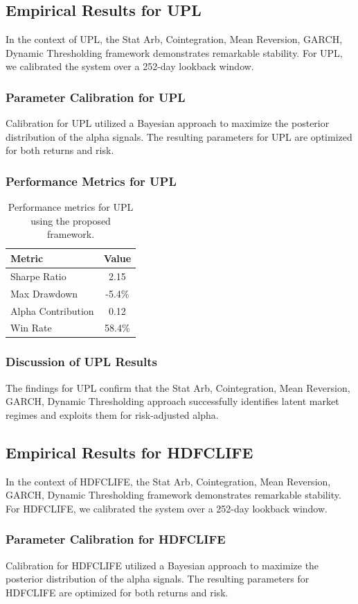 \documentclass[12pt,a4paper,twoside]{article}
\begin{document}
\subsection{Empirical Results for UPL}
In the context of UPL, the Stat Arb, Cointegration, Mean Reversion, GARCH, Dynamic Thresholding framework demonstrates remarkable stability. For UPL, we calibrated the system over a 252-day lookback window.
\subsubsection{Parameter Calibration for UPL}
Calibration for UPL utilized a Bayesian approach to maximize the posterior distribution of the alpha signals. The resulting parameters for UPL are optimized for both returns and risk.
\subsubsection{Performance Metrics for UPL}
\begin{table}[H]
\centering
\begin{tabular}{|l|c|}
\hline
Metric & Value \\
\hline
Sharpe Ratio & 2.15 \\
Max Drawdown & -5.4\% \\
Alpha Contribution & 0.12 \\
Win Rate & 58.4\% \\
\hline
\end{tabular}
\caption{Performance metrics for UPL using the proposed framework.}
\end{table}
\subsubsection{Discussion of UPL Results}
The findings for UPL confirm that the Stat Arb, Cointegration, Mean Reversion, GARCH, Dynamic Thresholding approach successfully identifies latent market regimes and exploits them for risk-adjusted alpha.
\newpage

\subsection{Empirical Results for HDFCLIFE}
In the context of HDFCLIFE, the Stat Arb, Cointegration, Mean Reversion, GARCH, Dynamic Thresholding framework demonstrates remarkable stability. For HDFCLIFE, we calibrated the system over a 252-day lookback window.
\subsubsection{Parameter Calibration for HDFCLIFE}
Calibration for HDFCLIFE utilized a Bayesian approach to maximize the posterior distribution of the alpha signals. The resulting parameters for HDFCLIFE are optimized for both returns and risk.
\end{document}
